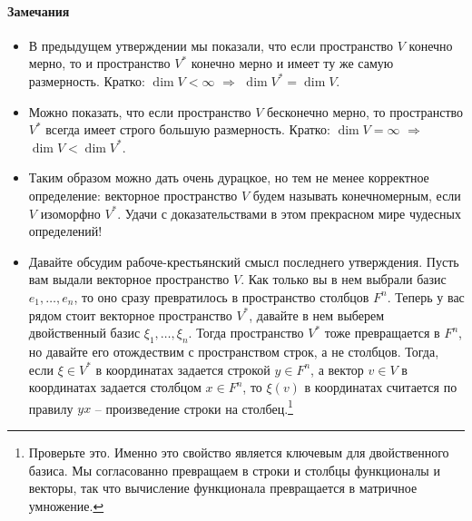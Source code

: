 \paragraph{Замечания}
\begin{itemize}
\item В предыдущем утверждении мы показали, что если пространство $V$ конечно мерно, то и пространство $V^*$ конечно мерно и имеет ту же самую размерность. Кратко:  $\dim V <\infty$ $\Rightarrow$ $\dim V^* = \dim V$.

\item Можно показать, что если пространство $V$ бесконечно мерно, то пространство $V^*$ всегда имеет строго большую размерность. Кратко: $\dim V = \infty$ $\Rightarrow$ $\dim V < \dim V^*$.

\item Таким образом можно дать очень дурацкое, но тем не менее корректное определение: векторное пространство $V$ будем называть конечномерным, если $V$ изоморфно $V^*$. Удачи с доказательствами в этом прекрасном мире чудесных определений!

\item Давайте обсудим рабоче-крестьянский смысл последнего утверждения. Пусть вам выдали векторное пространство $V$. Как только вы в нем выбрали базис $e_1,\ldots,e_n$, то оно сразу превратилось в пространство столбцов $F^n$. Теперь у вас рядом стоит векторное пространство $V^*$, давайте в нем выберем двойственный базис $\xi_1,\ldots,\xi_n$. Тогда пространство $V^*$ тоже превращается в $F^n$, но давайте его отождествим с пространством строк, а не столбцов. Тогда, если $\xi \in V^*$ в координатах задается строкой $y\in F^n$, а вектор $v\in V$ в координатах задается столбцом $x\in F^n$, то $\xi(v)$ в координатах считается по правилу $yx$ -- произведение строки на столбец.\footnote{Проверьте это. Именно это свойство является ключевым для двойственного базиса. Мы согласованно превращаем в строки и столбцы функционалы и векторы, так что вычисление функционала превращается в матричное умножение.}
\end{itemize}

